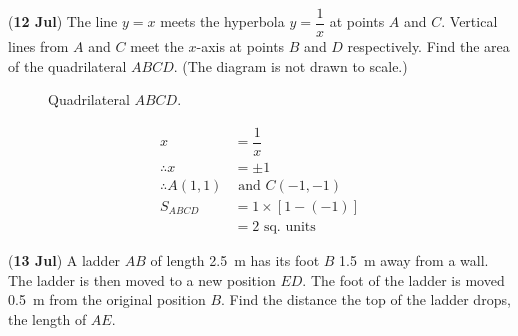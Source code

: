 \documentclass[12pt,answers]{exam}
\newcommand{\oneover}[1]{\dfrac{1}{#1}}
\newcommand{\qndate}[2]{(\textbf{#1 #2})}
\begin{document}
\begin{questions}
  \question \qndate{12}{Jul} The line $y = x$ meets the hyperbola
  $y=\oneover{x}$
  at points $A$ and $C$. Vertical lines from $A$ and $C$ meet the
  $x$-axis at points $B$
  and $D$ respectively. Find the area of the quadrilateral $ABCD$.
  (The diagram is
  not drawn to scale.)
  \begin{figure}[htpb]
    \centering
    \caption{Quadrilateral $ABCD$.}
    \label{fig:0712}
  \end{figure}
  \begin{solution}
    \begin{align*}
      x                 & = \oneover{x}                               \\
      \therefore x      & = \pm 1                                     \\
      \therefore A(1,1) & \text{ and } C(-1,-1)                       \\
      S_{ABCD}          & = 1 \times \left[1 - \left(-1\right)\right] \\
      & = 2 \text{ sq. units}
    \end{align*}
  \end{solution}

  \question \qndate{13}{Jul} A ladder $AB$ of length \qty{2.5}{\metre} has its
  foot $B$ \qty{1.5}{\metre} away from a wall. The ladder is then moved to a new
  position $ED$. The foot of the ladder is moved \qty{.5}{\metre} from the
  original position $B$. Find the distance the top of the ladder drops,
  the length of $AE$.


\end{questions}
\end{document}
